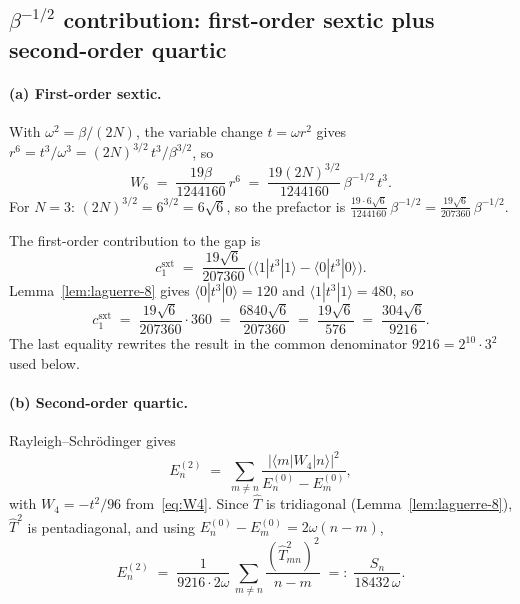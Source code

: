\documentclass[11pt,a4paper]{article}
\theoremstyle{definition}
\begin{document}
\subsection{$\beta^{-1/2}$ contribution: first-order sextic plus
second-order quartic}\label{ssec:c1}

\paragraph{(a) First-order sextic.}
With $\omega^2 = \beta/(2N)$, the variable change $t = \omega r^2$
gives $r^6 = t^3/\omega^3 = (2N)^{3/2}\,t^3/\beta^{3/2}$, so
\begin{equation}\label{eq:W6}
W_6 \;=\; \frac{19\beta}{1244160}\,r^6
\;=\; \frac{19(2N)^{3/2}}{1244160}\,\beta^{-1/2}\,t^3.
\end{equation}
For $N=3$: $(2N)^{3/2} = 6^{3/2} = 6\sqrt{6}$, so the prefactor is
$\frac{19\cdot 6\sqrt{6}}{1244160}\,\beta^{-1/2} = \frac{19\sqrt{6}}{207360}\,\beta^{-1/2}$.

The first-order contribution to the gap is
\[
c_1^{\mathrm{sxt}}
\;=\;
\frac{19\sqrt{6}}{207360}\,\bigl(\langle 1|t^3|1\rangle - \langle 0|t^3|0\rangle\bigr).
\]
Lemma~\ref{lem:laguerre-8} gives $\langle 0|t^3|0\rangle = 120$ and
$\langle 1|t^3|1\rangle = 480$, so
\begin{equation}\label{eq:c1-sext}
c_1^{\mathrm{sxt}}
\;=\; \frac{19\sqrt{6}}{207360}\cdot 360
\;=\; \frac{6840\sqrt{6}}{207360}
\;=\; \frac{19\sqrt{6}}{576}
\;=\; \frac{304\sqrt{6}}{9216}.
\end{equation}
The last equality rewrites the result in the common denominator
$9216 = 2^{10}\cdot 3^2$ used below.

\paragraph{(b) Second-order quartic.}
Rayleigh--Schr\"odinger gives
\[
E_n^{(2)} \;=\; \sum_{m\ne n}
\frac{|\langle m|W_4|n\rangle|^2}{E_n^{(0)}-E_m^{(0)}},
\]
with $W_4 = -t^2/96$ from~\eqref{eq:W4}. Since $\hat T$ is tridiagonal
(Lemma~\ref{lem:laguerre-8}), $\hat T^2$ is pentadiagonal, and using
$E_n^{(0)}-E_m^{(0)} = 2\omega(n-m)$,
\begin{equation}\label{eq:En-2}
E_n^{(2)} \;=\; \frac{1}{9216\cdot 2\omega}\,
\sum_{m\ne n}\frac{(\hat T^2_{mn})^2}{n-m}
\;=:\; \frac{S_n}{18432\,\omega}.
\end{equation}
\end{document}
